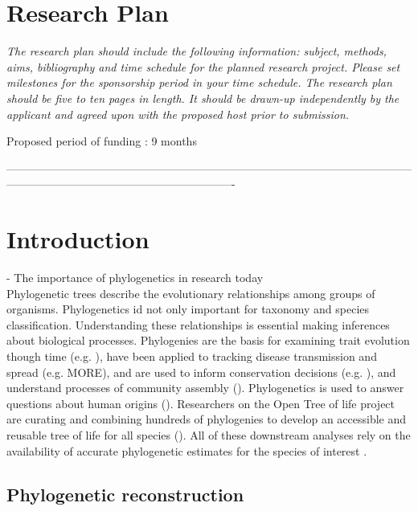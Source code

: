 \documentclass[10pt]{article}
\begin{document}
\section*{Research Plan}                   

\textsl{The research plan should include the following information: subject, methods, aims, bibliography and time schedule for the planned research project. 
Please set milestones for the sponsorship period in your time schedule.
The research plan should be five to ten pages in length.
It should be drawn-up independently by the applicant and agreed upon with the proposed host prior to submission.}

Proposed period of funding : 9 months


-------------------------------------------------------------------------------------------------------------------------------------------------------------------------
\section*{Introduction}
  - The importance of phylogenetics in research today\\
Phylogenetic trees describe the evolutionary relationships among groups of organisms. 
Phylogenetics id not only important for taxonomy and species classification. 
Understanding these relationships is essential making inferences about biological processes. 
Phylogenies are the basis for examining trait evolution though time (e.g. 
\cite{omeara_testing_2006}), have been applied to tracking disease transmission and spread (e.g. 
\cite{timme_phylogenetic_2013} MORE), and are used to inform conservation decisions (e.g. 
\cite{isaac_mammals_2007}), and understand processes of community assembly (\cite{emerson_phylogenetic_2008}). 
Phylogenetics is used to answer questions about human origins (\cite{endicott_using_2010}). 
Researchers on the Open Tree of life project are curating and combining hundreds of phylogenies to develop an accessible and reusable tree of life for all species (\cite{drew_lost_2013}). 
All of these downstream analyses rely on the availability of accurate phylogenetic estimates for the species of interest \cite{stoltzfus_phylotastic!_2013}.


\subsection*{Phylogenetic reconstruction}
\end{document}
